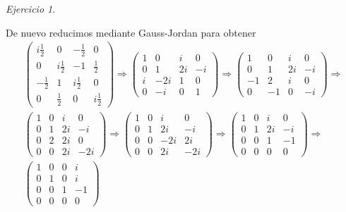 \documentclass[11pt,a4paper]{article}
\theoremstyle{definition}
\theoremstyle{remark}
\newtheorem{exc}{Ejercicio}
\begin{document}
\begin{exc}
\begin{enumerate}
						De nuevo reducimos mediante Gauss-Jordan para obtener 
						\begin{multline}
						\begin{pmatrix}
				    	i\frac{1}{2} & 0 & -\frac{1}{2} & 0
				    	\\ 0 & i\frac{1}{2} & -1 & \frac{1}{2} 
				    	\\ -\frac{1}{2} & 1 & i\frac{1}{2} & 0
				    	\\ 0 & \frac{1}{2} & 0 & i\frac{1}{2}
				    	\end{pmatrix}  \Rightarrow
				    	\begin{pmatrix}
				    	1 & 0 & i & 0
				    	\\ 0 & 1 & 2i & -i 
				    	\\ i & -2i & 1 & 0
				    	\\ 0 & -i & 0 & 1
				    	\end{pmatrix}  \Rightarrow
				    	\begin{pmatrix}
				    	1 & 0 & i & 0
				    	\\ 0 & 1 & 2i & -i 
				    	\\ -1 & 2 & i & 0
				    	\\ 0 & -1 & 0 & -i
				    	\end{pmatrix}  \Rightarrow \\
				    	\begin{pmatrix}
				    	1 & 0 & i & 0
				    	\\ 0 & 1 & 2i & -i 
				    	\\ 0 & 2 & 2i & 0
				    	\\ 0 & 0 & 2i & -2i
				    	\end{pmatrix}  \Rightarrow
				    	\nonumber
				    	\begin{pmatrix}
				    	1 & 0 & i & 0
				    	\\ 0 & 1 & 2i & -i 
				    	\\ 0 & 0 & -2i & 2i
				    	\\ 0 & 0 & 2i & -2i
				    	\end{pmatrix}  \Rightarrow
				    	\begin{pmatrix}
				    	1 & 0 & i & 0
				    	\\ 0 & 1 & 2i & -i 
				    	\\ 0 & 0 & 1 & -1
				    	\\ 0 & 0 & 0 & 0
				    	\end{pmatrix}\Rightarrow
				    	\\\begin{pmatrix}
				    	1 & 0 & 0 & i
				    	\\ 0 & 1 & 0 & i 
				    	\\ 0 & 0 & 1 & -1
				    	\\ 0 & 0 & 0 & 0
				    	\end{pmatrix}
						\end{multline}
						

\end{enumerate}
\end{exc}
\end{document}
